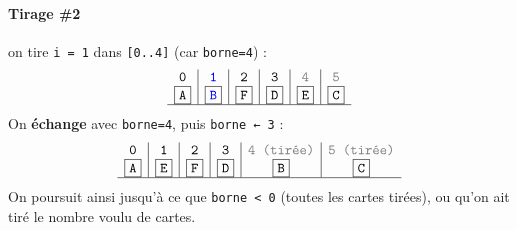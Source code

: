 \paragraph{Tirage \#2} on tire \texttt{i = 1} dans \texttt{[0..4]} (car \texttt{borne=4}) :
\[
\begin{array}{c|c|c|c|c|c}
\texttt{0} & \color{blue}{\texttt{1}} & \texttt{2} & \texttt{3} & \color{gray}{\texttt{4}} & \color{gray}{\texttt{5}}\\
\boxed{\texttt{A}} & \boxed{\color{blue}{\texttt{B}}} & \boxed{\texttt{F}} & \boxed{\texttt{D}} & \boxed{\texttt{E}} & \fbox{\texttt{C}} \\
\hline
\end{array}
\]
On \textbf{échange} avec \texttt{borne=4}, puis \texttt{borne ← 3} :
\[
\begin{array}{c|c|c|c|c|c}
\texttt{0} & \texttt{1} & \texttt{2} & \texttt{3} & \color{gray}{\texttt{4 (tirée)}} & \color{gray}{\texttt{5 (tirée)}}\\
\boxed{\texttt{A}} & \boxed{\texttt{E}} & \boxed{\texttt{F}} & \boxed{\texttt{D}} & \fbox{\texttt{B}} & \fbox{\texttt{C}} \\
\hline
\end{array}
\]
On poursuit ainsi jusqu’à ce que \texttt{borne < 0} (toutes les cartes tirées), ou qu’on ait tiré le nombre voulu de cartes.



